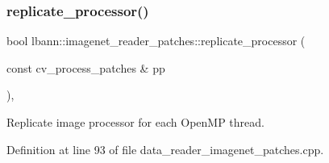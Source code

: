 \subsubsection{\texorpdfstring{replicate\+\_\+processor()}{replicate\_processor()}}
{\footnotesize\ttfamily bool lbann\+::imagenet\+\_\+reader\+\_\+patches\+::replicate\+\_\+processor (\begin{DoxyParamCaption}\item[{const cv\+\_\+process\+\_\+patches \&}]{pp }\end{DoxyParamCaption})\hspace{0.3cm}{\ttfamily [protected]}, {\ttfamily [virtual]}}



Replicate image processor for each Open\+MP thread. 



Definition at line 93 of file data\+\_\+reader\+\_\+imagenet\+\_\+patches.\+cpp.


